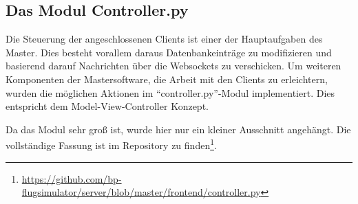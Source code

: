 

\subsection{Das Modul Controller.py}
Die Steuerung der angeschlossenen Clients ist einer der Hauptaufgaben des
Master. Dies besteht vorallem daraus Datenbankeinträge zu modifizieren und
basierend darauf Nachrichten über die Websockets zu verschicken. Um weiteren
Komponenten der Mastersoftware, die Arbeit mit den Clients zu erleichtern,
wurden die möglichen Aktionen im "`controller.py"'-Modul implementiert. Dies
entspricht dem Model-View-Controller Konzept.

Da das Modul sehr groß ist, wurde hier nur ein kleiner Ausschnitt angehängt.
Die vollständige Fassung ist im Repository zu finden\footnote{\url{https://github.com/bp-flugsimulator/server/blob/master/frontend/controller.py}}.


